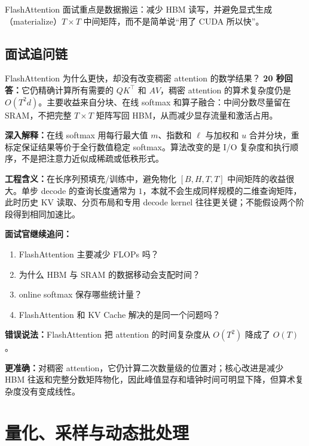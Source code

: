 \begin{takeawaybox}
FlashAttention 面试重点是数据搬运：减少 HBM 读写，并避免显式生成（materialize）$T\times T$ 中间矩阵，而不是简单说“用了 CUDA 所以快”。
\end{takeawaybox}

\section{面试追问链}

\begin{interviewbox}{FlashAttention 为什么更快，却没有改变稠密 attention 的数学结果？}
\textbf{20 秒回答：}它仍精确计算所有需要的 $QK^\top$ 和 $AV$，稠密 attention 的算术复杂度仍是 $O(T^2d)$。主要收益来自分块、在线 softmax 和算子融合：中间分数尽量留在 SRAM，不把完整 $T\times T$ 矩阵写回 HBM，从而减少显存流量和激活占用。

\textbf{深入解释：}在线 softmax 用每行最大值 $m$、指数和 $\ell$ 与加权和 $u$ 合并分块，重标定保证结果等价于全行数值稳定 softmax。算法改变的是 I/O 复杂度和执行顺序，不是把注意力近似成稀疏或低秩形式。

\textbf{工程含义：}在长序列预填充/训练中，避免物化 $[B,H,T,T]$ 中间矩阵的收益很大。单步 decode 的查询长度通常为 $1$，本就不会生成同样规模的二维查询矩阵，此时历史 KV 读取、分页布局和专用 decode kernel 往往更关键；不能假设两个阶段得到相同加速比。

\textbf{面试官继续追问：}
\begin{enumerate}
  \item FlashAttention 主要减少 FLOPs 吗？
  \item 为什么 HBM 与 SRAM 的数据移动会支配时间？
  \item online softmax 保存哪些统计量？
  \item FlashAttention 和 KV Cache 解决的是同一个问题吗？
\end{enumerate}
\end{interviewbox}

\begin{wrongbox}
\textbf{错误说法：}FlashAttention 把 attention 的时间复杂度从 $O(T^2)$ 降成了 $O(T)$。

\textbf{更准确：}对稠密 attention，它仍计算二次数量级的位置对；核心改进是减少 HBM 往返和完整分数矩阵物化，因此峰值显存和墙钟时间可明显下降，但算术复杂度没有变成线性。
\end{wrongbox}

\chapter{量化、采样与动态批处理}

